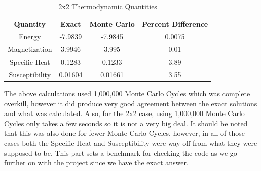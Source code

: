 \documentclass[12pt,righttag]{article}
\begin{document}
\begin{table}
	\begin{center}
		\caption{2x2 Thermodynamic Quantities}
		\begin{tabular}{c c c c}
			\hline\hline
			Quantity & Exact & Monte Carlo & Percent Difference  \\ 
			\hline
			Energy & -7.9839 & -7.9845 & 0.0075\\
		    Magnetization & 3.9946 & 3.995 & 0.01 \\
			Specific Heat & 0.1283 & 0.1233 & 3.89 \\
			Susceptibility & 0.01604 & 0.01661 & 3.55 \\
			
			
			\hline
		\end{tabular}
	\end{center}
\end{table}
	
	The above calculations used 1,000,000 Monte Carlo Cycles which was complete overkill, however it did produce very good agreement between the exact solutions and what was calculated. Also, for the 2x2 case, using 1,000,000 Monte Carlo Cycles only takes a few seconds so it is not a very big deal. It should be noted that this was also done for fewer Monte Carlo Cycles, however, in all of those cases both the Specific Heat and Susceptibility were way off from what they were supposed to be. This part sets a benchmark for checking the code as we go further on with the project since we have the exact answer.
	
\end{document}

